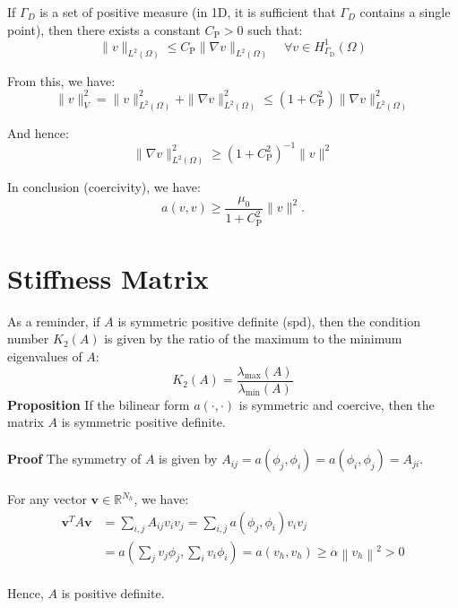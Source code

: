 \documentclass[11pt]{book}
\begin{document}
If $\Gamma_{D}$ is a set of positive measure (in 1D, it is sufficient that $\Gamma_{D}$ contains a single point), then there exists a constant $C_{\mathrm{P}}>0$ such that:
\begin{equation*}
\|v\|_{L^{2}(\Omega)} \leq C_{\mathrm{P}}\|\nabla v\|_{L^{2}(\Omega)} \quad \forall v \in H_{\Gamma_{\mathrm{D}}}^{1}(\Omega)
\end{equation*}

From this, we have:
\begin{equation*}
\|v\|_V^{2}=\|v\|_{L^{2}(\Omega)}^{2}+\|\nabla v\|_{L^{2}(\Omega)}^{2} \leq\left(1+C_{\mathrm{P}}^{2}\right)\|\nabla v\|_{L^{2}(\Omega)}^{2}
\end{equation*}

And hence:
\begin{equation*}
\|\nabla v\|_{L^{2}(\Omega)}^{2} \geq\left(1+C_{\mathrm{P}}^{2}\right)^{-1}\|v\|^{2}
\end{equation*}

In conclusion (coercivity), we have:
\begin{equation*}
a(v, v) \geq \frac{\mu_{0}}{1+C_{\mathrm{P}}^{2}}\|v\|^{2}.
\end{equation*}


\section{Stiffness Matrix}
As a reminder, if \(A\) is symmetric positive definite (spd), then the condition number \(K_{2}(A)\) is given by the ratio of the maximum to the minimum eigenvalues of \(A\):
\[
K_{2}(A)=\frac{\lambda_{\max }(A)}{\lambda_{\min }(A)}
\]
\textbf{Proposition}
If the bilinear form \(a(\cdot, \cdot)\) is symmetric and coercive, then the matrix \(A\) is symmetric positive definite. \\ \\
\textbf{Proof}
The symmetry of \(A\) is given by \(A_{i j}=a\left(\phi_{j}, \phi_{i}\right)=a\left(\phi_{i}, \phi_{j}\right)=A_{j i}\).\\ \\
For any vector \(\mathbf{v} \in \mathbb{R}^{N_{h}}\), we have: \\
\begin{align*}
\mathbf{v}^{T} A \mathbf{v} & =\sum_{i, j} A_{i j} v_{i} v_{j}=\sum_{i, j} a\left(\phi_{j}, \phi_{i}\right) v_{i} v_{j} \\
& =a\left(\sum_{j} v_{j} \phi_{j}, \sum_{i} v_{i} \phi_{i}\right)=a\left(v_{h}, v_{h}\right) \geq \alpha\left\|v_{h}\right\|^{2}>0
\end{align*}\\
Hence, \(A\) is positive definite. \\
\end{document}
